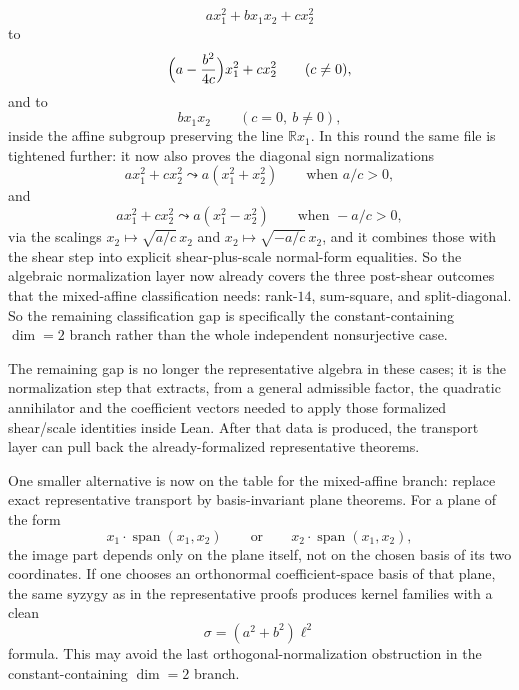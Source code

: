 \documentclass[11pt]{article}
\begin{document}
\begin{itemize}
\[    a x_1^2 + b x_1x_2 + c x_2^2
  \]
  to
  \[
    \Bigl(a - \frac{b^2}{4c}\Bigr) x_1^2 + c x_2^2
    \qquad (c \neq 0),
  \]
  and to
  \[
    b x_1x_2
    \qquad (c=0,\ b \neq 0),
  \]
  inside the affine subgroup preserving the line $\mathbb{R}x_1$.
  In this round the same file is tightened further: it now also proves the
  diagonal sign normalizations
  \[
    a x_1^2 + c x_2^2 \leadsto a(x_1^2+x_2^2)
    \qquad \text{when } a/c>0,
  \]
  and
  \[
    a x_1^2 + c x_2^2 \leadsto a(x_1^2-x_2^2)
    \qquad \text{when } -a/c>0,
  \]
  via the scalings
  \(x_2 \mapsto \sqrt{a/c}\,x_2\) and
  \(x_2 \mapsto \sqrt{-a/c}\,x_2\), and it combines those with the shear step
  into explicit shear-plus-scale normal-form equalities. So the algebraic
  normalization layer now already covers the three post-shear outcomes that the
  mixed-affine classification needs: rank-$14$, sum-square, and split-diagonal.
  So the remaining classification gap is specifically the constant-containing
  $\dim = 2$ branch rather than the whole independent nonsurjective case.
\end{itemize}

The remaining gap is no longer the representative algebra in these cases; it is
the normalization step that extracts, from a general admissible factor, the
quadratic annihilator and the coefficient vectors needed to apply those
formalized shear/scale identities inside Lean. After that data is produced, the
transport layer can pull back the already-formalized representative theorems.

One smaller alternative is now on the table for the mixed-affine branch:
replace exact representative transport by basis-invariant plane theorems.
For a plane of the form
\[
  x_1 \cdot \operatorname{span}(x_1,x_2)
  \qquad\text{or}\qquad
  x_2 \cdot \operatorname{span}(x_1,x_2),
\]
the image part depends only on the plane itself, not on the chosen basis of
its two coordinates. If one chooses an orthonormal coefficient-space basis of
that plane, the same syzygy as in the representative proofs produces kernel
families with a clean
\[
  \sigma = (a^2+b^2)\ell^2
\]
formula. This may avoid the last orthogonal-normalization obstruction in the
constant-containing $\dim = 2$ branch.
\end{document}
